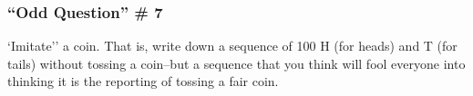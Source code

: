 \documentclass[handout]{beamer}
\begin{document}
%
%
\begin{frame}
\frametitle{``Odd Question'' \# 7}
\normalsize
`Imitate'' a coin. That is, write down a sequence of 100 H (for heads) and T (for tails) without tossing a coin--but a sequence that you think will fool everyone into thinking it is the reporting of tossing a fair coin.
		
\end{frame}
\end{document}
